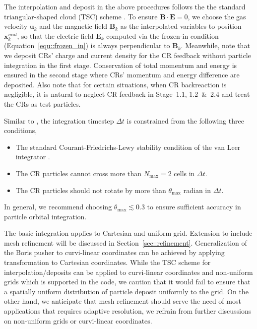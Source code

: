 \documentclass[fleqn,usenatbib]{mnras}
\begin{document}
The interpolation and deposit in the above procedures follows the the standard triangular-shaped cloud (TSC) scheme \citep{birdsall2004plasma}. To ensure $\boldsymbol{B} \cdot \boldsymbol{E}=0$, we choose the gas velocity $\boldsymbol{u}_k$ and the magnetic field $\boldsymbol{B}_k$ as the interpolated variables to position $\boldsymbol{x}_k^{mid}$, so that the electric field $\boldsymbol{E}_k$ computed via the frozen-in condition (Equation~\ref{equ::frozen_in}) is always perpendicular to $\boldsymbol{B}_k$. Meanwhile, note that we deposit CRs' charge and current density for the CR feedback without particle integration in the first stage. Conservation of total momentum and energy is ensured in the second stage where CRs' momentum and energy difference are deposited.
Also note that for certain situations, when CR backreaction is negligible, it is natural to neglect CR feedback in Stage~1.1, 1.2~\&~2.4 and treat the CRs as test particles.

Similar to \citet{2015ApJ...809...55B}, the integration timestep $\Delta t$ is constrained from the following three conditions,
\begin{itemize}
    \item The standard Courant-Friedrichs-Lewy stability condition of the van Leer integrator \citep{2009NewA...14..139S, 2020ApJS..249....4S}.
    \item The CR particles cannot cross more than $N_\text{max}=2$ cells in $\Delta t$.
    \item The CR particles should not rotate by more than $\theta_\text{max}$ radian in $\Delta t$.
\end{itemize}
In general, we recommend choosing $\theta_\text{max}\lesssim0.3$ to ensure sufficient accuracy in particle orbital integration.

The basic integration applies to Cartesian and uniform grid. Extension to include mesh refinement will be discussed in Section~\ref{sec::refinement}. Generalization of the Boris pusher to curvi-linear coordinates can be achieved by applying transformation to Cartesian coordinates. While the TSC scheme for interpolation/deposits can be applied to curvi-linear coordinates and non-uniform grids which is supported in the code, we caution that it would fail to ensure that a spatially uniform distribution of particle deposit uniformly to the grid.
On the other hand, we anticipate that mesh refinement should serve the need of most applications that requires adaptive resolution, we refrain from further discussions on non-uniform grids or curvi-linear coordinates.
\end{document}
